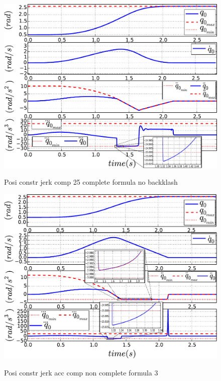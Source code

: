 \documentclass[a4paper, 10pt, conference]{ieeeconf}      %
\begin{document}
{{\begin{figure}[!htbp]
\centering
{\includegraphics[width=1.0\columnwidth]{figures/8_Posi_constr_jerk_comp_25_complete_formula_no_backklash}}
\caption{Posi constr jerk comp 25 complete formula no backklash} 
\label{fig:8_Posi_constr_jerk_comp_25_complete_formula_no_backklash}
\end{figure}
\begin{figure}[!htbp]
\centering
{\includegraphics[width=1.0\columnwidth]{figures/9_Posi_constr_jerk_acc_comp_non_complete_formula_3}}
\caption{Posi constr jerk acc comp non complete formula 3} 
\label{fig:9_Posi_constr_jerk_acc_comp_non_complete_formula_3}
\end{figure}
\begin{figure}[!htbp]

\end{figure}}}
\end{document}
